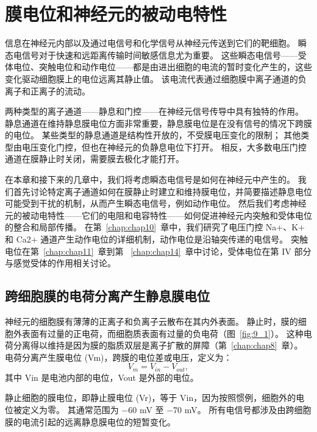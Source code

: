 \chapter{膜电位和神经元的被动电特性} \label{chap:chap9}

信息在神经元内部以及通过电信号和化学信号从神经元传送到它们的靶细胞。
瞬态电信号对于快速和远距离传输时间敏感信息尤为重要。
这些瞬态电信号——受体电位、突触电位和动作电位——都是由进出细胞的电流的暂时变化产生的，这些变化驱动细胞膜上的电位远离其静止值。
该电流代表通过细胞膜中离子通道的负离子和正离子的流动。


两种类型的离子通道——静息和门控——在神经元信号传导中具有独特的作用。
静息通道在维持静息膜电位方面非常重要，静息膜电位是在没有信号的情况下跨膜的电位。
某些类型的静息通道是结构性开放的，不受膜电压变化的限制；
其他类型由电压变化门控，但也在神经元的负静息电位下打开。
相反，大多数电压门控通道在膜静止时关闭，需要膜去极化才能打开。


在本章和接下来的几章中，我们将考虑瞬态电信号是如何在神经元中产生的。
我们首先讨论特定离子通道如何在膜静止时建立和维持膜电位，并简要描述静息电位可能受到干扰的机制，从而产生瞬态电信号，例如动作电位。
然后我们考虑神经元的被动电特性——它们的电阻和电容特性——如何促进神经元内突触和受体电位的整合和局部传播。
在第~\ref{chap:chap10}~章中，我们研究了电压门控 Na+、K+ 和 Ca2+ 通道产生动作电位的详细机制，动作电位是沿轴突传递的电信号。
突触电位在第~\ref{chap:chap11}~章到第 ~\ref{chap:chap14}~章中讨论，受体电位在第 IV 部分与感觉受体的作用相关讨论。



\section{跨细胞膜的电荷分离产生静息膜电位}

神经元的细胞膜有薄薄的正离子和负离子云散布在其内外表面。
静止时，膜的细胞外表面有过量的正电荷，而细胞质表面有过量的负电荷（图~\ref{fig:9_1}）。
这种电荷分离得以维持是因为膜的脂质双层是离子扩散的屏障（第~\ref{chap:chap8}~章）。
电荷分离产生膜电位 (Vm)，跨膜的电位差或电压，定义为：
\begin{equation}
	V_m = V_{in} - V_{out},
\end{equation}
其中 Vin 是电池内部的电位，Vout 是外部的电位。


静止细胞的膜电位，即静止膜电位 (Vr)，等于 Vin，因为按照惯例，细胞外的电位被定义为零。
其通常范围为 −60 mV 至 −70 mV。
所有电信号都涉及由跨细胞膜的电流引起的远离静息膜电位的短暂变化。


